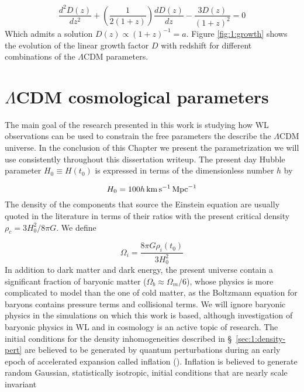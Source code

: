 \begin{equation}
\label{eq:1:growth-diff-cold}
\frac{d^2D(z)}{dz^2} + \left(\frac{1}{2(1+z)}\right)\frac{dD(z)}{dz}-\frac{3D(z)}{(1+z)^2} = 0
\end{equation}
% 
Which admits a solution $D(z)\propto (1+z)^{-1}=a$. Figure \ref{fig:1:growth} shows the evolution of the linear growth factor $D$ with redshift for different combinations of the $\Lambda$CDM parameters. 


\section{$\Lambda$CDM cosmological parameters}
The main goal of the research presented in this work is studying how WL observations can be used to constrain the free parameters the describe the $\Lambda$CDM universe. In the conclusion of this Chapter we present the parametrization we will use consistently throughout this dissertation writeup. The present day Hubble parameter $H_0\equiv H(t_0)$ is expressed in terms of the dimensionless number $h$ by

\begin{equation}
\label{eq:1:hubble-present}
H_0 = 100h\,{\rm km}\,{\rm s}^{-1}\,{\rm Mpc}^{-1}
\end{equation} 
%
The density of the components that source the Einstein equation are usually quoted in the literature in terms of their ratios with the present critical density $\rho_c=3H_0^2/8\pi G$. We define

\begin{equation}
\label{eq:1:omega-def}
\Omega_i = \frac{8\pi G\rho_i(t_0)}{3H_0^2}
\end{equation}
%
In addition to dark matter and dark energy, the present universe contain a significant fraction of baryonic matter ($\Omega_b\approx \Omega_m/6$), whose physics is more complicated to model than the one of cold matter, as the Boltzmann equation for baryons contains pressure terms and collisional terms. We will ignore baryonic physics in the simulations on which this work is based, although investigation of baryonic physics in WL and in cosmology is an active topic of research. The initial conditions for the density inhomogeneities described in \S~\ref{sec:1:density-pert} are believed to be generated by quantum perturbations during an early epoch of accelerated expansion called inflation (\citep{Inflation}). Inflation is believed to generate random Gaussian, statistically isotropic, initial conditions that are nearly scale invariant 

